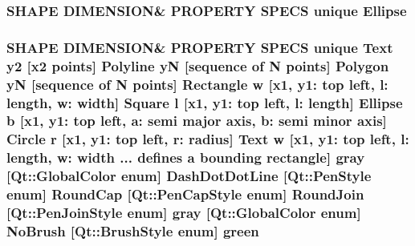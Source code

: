 \subsubsection[{\texorpdfstring{Ellipse}{Ellipse}}]{\setlength{\rightskip}{0pt plus 5cm}S\+H\+A\+PE D\+I\+M\+E\+N\+S\+I\+ON\& P\+R\+O\+P\+E\+R\+TY S\+P\+E\+CS unique {\bf Ellipse}}\hypertarget{shape__input__file__specs_8txt_a0d2a35a3e8361f31d6ad940ea7b1864c}{}\label{shape__input__file__specs_8txt_a0d2a35a3e8361f31d6ad940ea7b1864c}
\subsubsection[{\texorpdfstring{green}{green}}]{\setlength{\rightskip}{0pt plus 5cm}S\+H\+A\+PE D\+I\+M\+E\+N\+S\+I\+ON\& P\+R\+O\+P\+E\+R\+TY S\+P\+E\+CS unique {\bf Text} {\bf y2} \mbox{[}{\bf x2} points\mbox{]} {\bf Polyline} yN \mbox{[}sequence of N points\mbox{]} {\bf Polygon} yN \mbox{[}sequence of N points\mbox{]} {\bf Rectangle} w \mbox{[}{\bf x1}, y1\+: top left, l\+: length, w\+: width\mbox{]} {\bf Square} {\bf l} \mbox{[}{\bf x1}, y1\+: top left, l\+: length\mbox{]} {\bf Ellipse} b \mbox{[}{\bf x1}, y1\+: top left, a\+: semi major axis, b\+: semi minor axis\mbox{]} {\bf Circle} r \mbox{[}{\bf x1}, y1\+: top left, r\+: radius\mbox{]} {\bf Text} w \mbox{[}{\bf x1}, y1\+: top left, l\+: length, w\+: width ... defines {\bf a} bounding rectangle\mbox{]} gray \mbox{[}Qt\+::\+Global\+Color enum\mbox{]} Dash\+Dot\+Dot\+Line \mbox{[}Qt\+::\+Pen\+Style enum\mbox{]} Round\+Cap \mbox{[}{\bf Qt\+::\+Pen\+Cap\+Style} enum\mbox{]} Round\+Join \mbox{[}{\bf Qt\+::\+Pen\+Join\+Style} enum\mbox{]} gray \mbox{[}Qt\+::\+Global\+Color enum\mbox{]} No\+Brush \mbox{[}{\bf Qt\+::\+Brush\+Style} enum\mbox{]} green}\hypertarget{shape__input__file__specs_8txt_aab3139c695d35a69810f54c8dc5251d6}{}\label{shape__input__file__specs_8txt_aab3139c695d35a69810f54c8dc5251d6}
